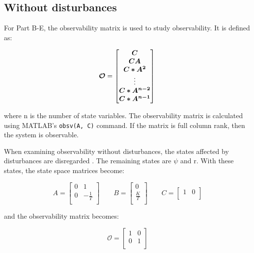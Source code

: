 \subsection{Without disturbances}
For Part B-E, the observability matrix is used to study observability. It is defined as:

\begin{equation}
  \bm{\mathcal{O}} =
  \begin{bmatrix}
    \bm{C} \\
    \bm{CA} \\
    \bm{C*A^2} \\
    \vdots \\
    \bm{C*A^{n-2}} \\
    \bm{C*A^{n-1}} \\
  \end{bmatrix} \\
\end{equation}

where n is the number of state variables. The observability matrix is calculated using MATLAB's \texttt{obsv(A, C)} command.  If the matrix is full column rank, then the system is observable.

When examining observability without disturbances, the states affected by disturbances are disregarded . The remaining states are $\psi$ and r. With these states, the state space matrices become:

\begin{equation}
    A = 
	\begin{bmatrix}
    0 & 1            \\
	0 & -\frac{1}{T} \\
	\end{bmatrix}
  \qquad
  B =
  \begin{bmatrix}
	0 \\
    \frac{K}{T} \\
  \end{bmatrix}
  \qquad
  C =
  \begin{bmatrix}
    1 & 0\\
  \end{bmatrix}
\end{equation}

and the observability matrix becomes:

\begin{equation}
  \bm{\mathcal{O}} =
  \begin{bmatrix}
    1 & 0 \\
    0 & 1 \\
  \end{bmatrix}
\end{equation}

